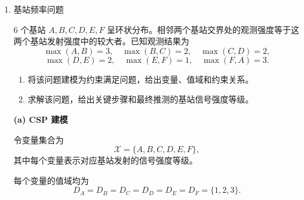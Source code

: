 \documentclass[a4paper]{article}
\begin{document}
\begin{enumerate}
\begin{solution}
\textbf{(b) 求解过程}

利用约束传播逐步缩减值域。

第 1 行为
\[
1,\ 3,\ \_,\ 2
\]
缺少的数字只有 4，因此
\[
X_{13}=4.
\]

左上 \(2\times 2\) 子网格为
\[
\begin{matrix}
1 & 3\\
\_ & \_
\end{matrix}
\]
缺少 \(\{2,4\}\)。而第 2 列目前为
\[
3,\ \_,\ 4,\ \_,
\]
缺少 \(\{1,2\}\)，所以
\[
X_{22}=2.
\]
进而左上子网格中另一个空格只能为 4，即
\[
X_{21}=4.
\]

第 2 行此时为
\[
4,\ 2,\ 3,\ \_,
\]
缺少的数字只有 1，因此
\[
X_{24}=1.
\]

第 1 列此时为
\[
1,\ 4,\ \_,\ 3,
\]
缺少的数字只有 2，因此
\[
X_{31}=2.
\]

第 3 行变为
\[
2,\ 4,\ \_,\ 3,
\]
缺少的数字只有 1，因此
\[
X_{33}=1.
\]

第 2 列为
\[
3,\ 2,\ 4,\ \_,
\]
缺少的数字只有 1，因此
\[
X_{42}=1.
\]

第 4 行变为
\[
3,\ 1,\ 2,\ \_,
\]
缺少的数字只有 4，因此
\[
X_{44}=4.
\]

故完整数独解为
\[
\begin{matrix}
1 & 3 & 4 & 2\\
4 & 2 & 3 & 1\\
2 & 4 & 1 & 3\\
3 & 1 & 2 & 4
\end{matrix}
\]
\end{solution}

\item 基站频率问题

6 个基站 \(A,B,C,D,E,F\) 呈环状分布。相邻两个基站交界处的观测强度等于这两个基站发射强度中的较大者。已知观测结果为
\[
\max(A,B)=3,\quad \max(B,C)=2,\quad \max(C,D)=2,
\]
\[
\max(D,E)=2,\quad \max(E,F)=1,\quad \max(F,A)=3.
\]

\begin{enumerate}
\item 将该问题建模为约束满足问题，给出变量、值域和约束关系。
\item 求解该问题，给出关键步骤和最终推测的基站信号强度等级。
\end{enumerate}

\begin{solution}
\textbf{(a) CSP 建模}

令变量集合为
\[
\mathcal X=\{A,B,C,D,E,F\},
\]
其中每个变量表示对应基站发射的信号强度等级。

每个变量的值域均为
\[
D_A=D_B=D_C=D_D=D_E=D_F=\{1,2,3\}.
\]


\end{solution}
\end{enumerate}
\end{document}
